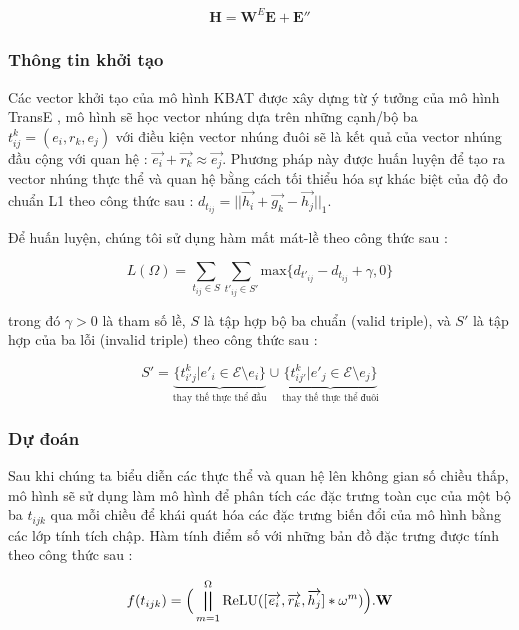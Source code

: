 \begin{align}
\mathbf{H} = \mathbf{W}^E \mathbf{E} + \mathbf{E''}
\end{align}

\subsubsection{Thông tin khởi tạo}
\label{sec:KBATTraning}

Các vector khởi tạo của mô hình KBAT được xây dựng từ ý tưởng của mô hình TransE \cite{bordes2013translating}, mô hình sẽ học vector nhúng dựa trên những cạnh/bộ ba $t^k_{ij} = (e_i, r_k, e_j)$ với điều kiện vector nhúng đuôi sẽ là kết quả của vector nhúng đầu cộng với quan hệ : $\vec{e_i}+\vec{r_k} \approx \vec{e_j}$. Phương pháp này được huấn luyện để tạo ra vector nhúng thực thể và quan hệ bằng cách tối thiểu hóa sự khác biệt của độ đo chuẩn L1 theo công thức sau :
$d_{t_{ij}} = \big|\big|\vec{h_i}+ \vec{g_k}-\vec{h_j}\big|\big|_1$.

Để huấn luyện, chúng tôi sử dụng hàm mất mát-lề theo công thức sau :

\begin{equation}
L(\Omega)=\sum_{t_{ij} \in S} \sum_{t'_{ij} \in S'} \text{max}\{d_{t'_{ij}} - d_{t_{ij}} + \gamma , 0 \}
\end{equation}

trong đó $\gamma > 0$ là tham số lề, $S$ là tập hợp bộ ba chuẩn (valid triple), và $S'$ là tập hợp của ba lỗi (invalid triple) theo công thức sau :

\begin{equation}
{S'} ={\underbrace{\{ t^k_{i'j} | e'_i \in \mathcal{E}\setminus e_i\}}_{\text{thay thế thực thể đầu}}\cup \underbrace{\{ t^k_{ij'} | e'_j \in \mathcal{E}\setminus e_j\}}_{\text{thay thế thực thể đuôi}}}
\end{equation}

\subsubsection{Dự đoán}

Sau khi chúng ta biểu diễn các thực thể và quan hệ lên không gian số chiều thấp, mô hình sẽ sử dụng \cite{nguyen2017novel} làm mô hình để phân tích các đặc trưng toàn cục của một bộ ba $t_{ijk}$ qua mỗi chiều để khái quát hóa các đặc trưng biến đổi của mô hình bằng các lớp tính tích chập. Hàm tính điểm số với những bản đồ đặc trưng được tính theo công thức sau :

\begin{equation}
f(t_{i j k}) = \Big( \bigparallel_{m=1}^{\Omega} \text{ReLU} ([\overrightarrow{e_i}, \overrightarrow{r_k}, \overrightarrow{h_j}] \ast \omega^m)\Big).\mathbf{W}
\end{equation}


